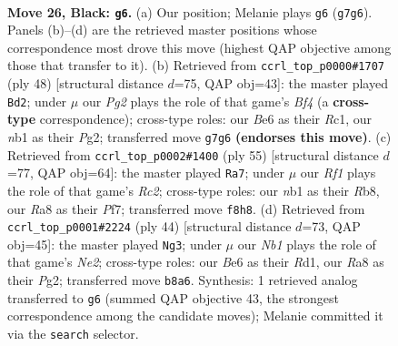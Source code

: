 \documentclass[11pt]{article}
\begin{document}
\clearpage

\begin{figure}[p]\centering
\begin{subfigure}{0.46\textwidth}\centering
\resizebox{\linewidth}{!}{%
\newchessgame
\chessboard[
  setfen={rn3r2/1p1kb1pp/4b2P/p2pPp2/8/P5P1/4N1K1/RNB2R2 b - - 0 26},
  showmover=false,
  pgfstyle=straightmove, color=movearrow, markmove={g7-g6}
]}
\caption{}
\end{subfigure}\hfill
\begin{subfigure}{0.46\textwidth}\centering
\resizebox{\linewidth}{!}{%
\newchessgame
\chessboard[
  setfen={3r2k1/p1r2pb1/B3b1pp/3nP3/R4B1P/2P2N2/5PP1/2R3K1 w - - 3 25},
  showmover=false,
  pgfstyle=straightmove, color=movearrow, markmove={f4-d2}
]}
\caption{}
\end{subfigure}
\\[4pt]
\begin{subfigure}{0.46\textwidth}\centering
\resizebox{\linewidth}{!}{%
\newchessgame
\chessboard[
  setfen={br4k1/2r2p2/3b1p1p/p1pp4/4P3/1P1B2P1/P1RN1PP1/2R3K1 b - - 0 28},
  showmover=false,
  pgfstyle=straightmove, color=movearrow, markmove={c7-a7}
]}
\caption{}
\end{subfigure}\hfill
\begin{subfigure}{0.46\textwidth}\centering
\resizebox{\linewidth}{!}{%
\newchessgame
\chessboard[
  setfen={2r1k2r/1b1nn3/p7/1p1pp3/7P/P2BB3/2P1N1PR/2KR4 w - - 0 23},
  showmover=false,
  pgfstyle=straightmove, color=movearrow, markmove={e2-g3}
]}
\caption{}
\end{subfigure}
\caption{\textbf{Move 26, Black: \texttt{g6}.} (a) Our position; Melanie plays \texttt{g6} (\texttt{g7g6}). Panels (b)--(d) are the retrieved master positions whose correspondence most drove this move (highest QAP objective among those that transfer to it). (b) Retrieved from \texttt{ccrl\_top\_p0000\#1707} (ply 48) [structural distance $d$=75, QAP obj=43]: the master played \texttt{Bd2}; under $\mu$ our \emph{Pg2} plays the role of that game's \emph{Bf4} (a \textbf{cross-type} correspondence); cross-type roles: our \emph{B}e6 as their \emph{R}c1, our \emph{n}b1 as their \emph{P}g2; transferred move \texttt{g7g6} \textbf{(endorses this move)}. (c) Retrieved from \texttt{ccrl\_top\_p0002\#1400} (ply 55) [structural distance $d$=77, QAP obj=64]: the master played \texttt{Ra7}; under $\mu$ our \emph{Rf1} plays the role of that game's \emph{Rc2}; cross-type roles: our \emph{n}b1 as their \emph{R}b8, our \emph{R}a8 as their \emph{P}f7; transferred move \texttt{f8h8}. (d) Retrieved from \texttt{ccrl\_top\_p0001\#2224} (ply 44) [structural distance $d$=73, QAP obj=45]: the master played \texttt{Ng3}; under $\mu$ our \emph{Nb1} plays the role of that game's \emph{Ne2}; cross-type roles: our \emph{B}e6 as their \emph{R}d1, our \emph{R}a8 as their \emph{P}g2; transferred move \texttt{b8a6}. Synthesis: 1 retrieved analog transferred to \texttt{g6} (summed QAP objective 43, the strongest correspondence among the candidate moves); Melanie committed it via the \texttt{search} selector.}
\label{fig:thought-m51}
\end{figure}
\end{document}
